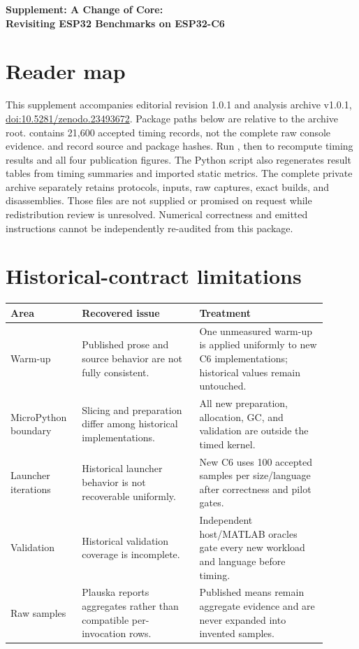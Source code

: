 \documentclass[10pt]{article}
\begin{document}
\begin{center}\Large\bfseries Supplement: A Change of Core:\\ Revisiting ESP32 Benchmarks on ESP32-C6\end{center}
\section{Reader map}
This supplement accompanies editorial revision 1.0.1 and analysis archive v1.0.1, \href{https://doi.org/10.5281/zenodo.23493672}{doi:10.5281/zenodo.23493672}.
Package paths below are relative to the archive root.  contains 21,600 accepted timing records, not the complete raw console evidence.  and  record source and package hashes. Run , then  to recompute timing results and all four publication figures. The Python script also regenerates result tables from timing summaries and imported static metrics. The complete private archive separately retains protocols, inputs, raw captures, exact builds, and disassemblies. Those files are not supplied or promised on request while redistribution review is unresolved. Numerical correctness and emitted instructions cannot be independently re-audited from this package.

\section{Historical-contract limitations}
\begin{longtable}{@{}>{\raggedright\arraybackslash}p{0.19\linewidth}>{\raggedright\arraybackslash}p{0.34\linewidth}>{\raggedright\arraybackslash}p{0.37\linewidth}@{}}
\toprule Area & Recovered issue & Treatment \\ \midrule\endhead
Warm-up & Published prose and source behavior are not fully consistent. & One unmeasured warm-up is applied uniformly to new C6 implementations; historical values remain untouched.\\
MicroPython boundary & Slicing and preparation differ among historical implementations. & All new preparation, allocation, GC, and validation are outside the timed kernel.\\
Launcher iterations & Historical launcher behavior is not recoverable uniformly. & New C6 uses 100 accepted samples per size/language after correctness and pilot gates.\\
Validation & Historical validation coverage is incomplete. & Independent host/MATLAB oracles gate every new workload and language before timing.\\
Raw samples & Plauska reports aggregates rather than compatible per-invocation rows. & Published means remain aggregate evidence and are never expanded into invented samples.\\
\bottomrule
\end{longtable}
\end{document}

